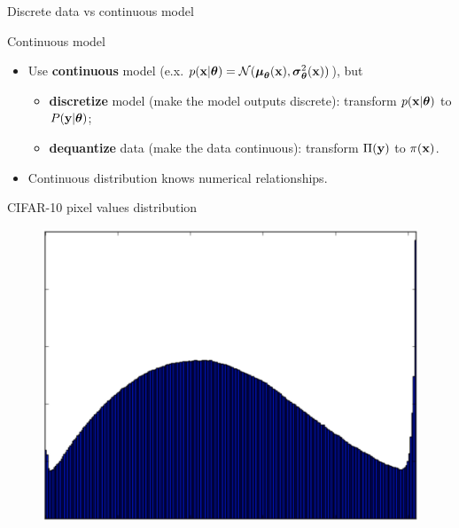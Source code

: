 \documentclass{beamer}
\begin{document}
\begin{frame}{Discrete data vs continuous model}
	\begin{block}{Continuous model}
		\begin{itemize}
			\item Use \textbf{continuous} model (e.x. $p(\mathbf{x} | \boldsymbol{\theta}) = \mathcal{N}(\boldsymbol{\mu}_{\boldsymbol{\theta}}(\mathbf{x}), \boldsymbol{\sigma}_{\boldsymbol{\theta}}^2(\mathbf{x}))$), but
			\begin{itemize}
				\item \textbf{discretize} model (make the model outputs discrete): transform $p(\mathbf{x} | \boldsymbol{\theta})$ to $P(\mathbf{y} | \boldsymbol{\theta})$;
				\item \textbf{dequantize} data (make the data continuous): transform $\Pi(\mathbf{y})$ to $\pi(\mathbf{x})$.
			\end{itemize}
			\item Continuous distribution knows numerical relationships.
		\end{itemize}
	\end{block}
	\begin{block}{CIFAR-10 pixel values distribution}
		\begin{figure}
			\includegraphics[width=0.6\linewidth,height=0.2\linewidth]{figs/CIFAR_pixel_distr}
		\end{figure}
	\end{block}
\end{frame}
\end{document}
